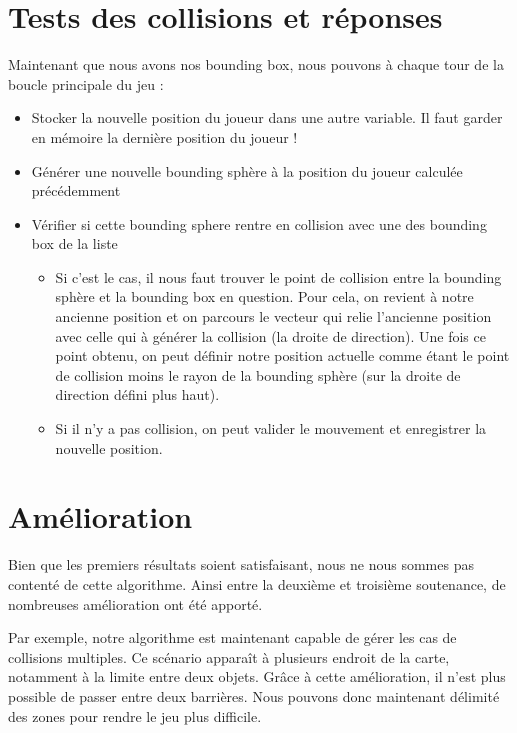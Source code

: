 \documentclass[11pt]{report}
\begin{document}
\section{Tests des collisions et réponses}

Maintenant que nous avons nos bounding box, nous pouvons à chaque tour de la boucle principale du jeu :

\begin{itemize}
\item Stocker la nouvelle position du joueur dans une autre variable. Il faut garder en mémoire la dernière position du joueur !
\item Générer une nouvelle bounding sphère à la position du joueur calculée précédemment
\item Vérifier si cette bounding sphere rentre en collision avec une des bounding box de la liste
\begin{itemize}
\item Si c'est le cas, il nous faut trouver le point de collision entre la bounding sphère et la bounding box en question. Pour cela, on revient à notre ancienne position et on parcours le vecteur qui relie l'ancienne position avec celle qui à générer la collision (la droite de direction). Une fois ce point obtenu, on peut définir notre position actuelle comme étant le point de collision moins le rayon de la bounding sphère (sur la droite de direction défini plus haut).
\item Si il n'y a pas collision, on peut valider le mouvement et enregistrer la nouvelle position.
\end{itemize}
\end{itemize}

\section{Amélioration}

Bien que les premiers résultats soient satisfaisant, nous ne nous sommes pas contenté de cette algorithme. Ainsi entre la deuxième et troisième soutenance, de nombreuses amélioration ont été apporté. 

Par exemple, notre algorithme est maintenant capable de gérer les cas de collisions multiples. Ce scénario apparaît à plusieurs endroit de la carte, notamment à la limite entre deux objets. Grâce à cette amélioration, il n'est plus possible de passer entre deux barrières. Nous pouvons donc maintenant délimité des zones pour rendre le jeu plus difficile.
\end{document}
